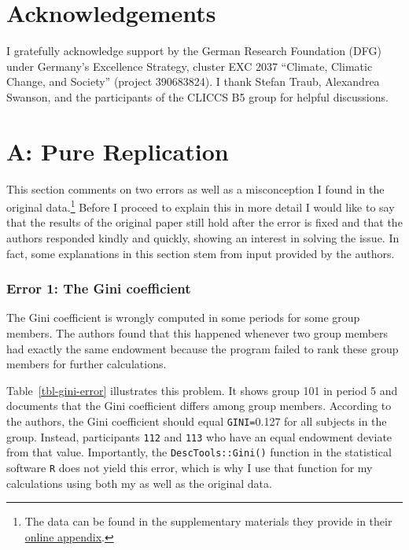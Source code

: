 \documentclass[
  authoryear,
  review,
  3p,
  onecolumn]{elsarticle}
\begin{document}
\hypertarget{acknowledgements}{%
\section{Acknowledgements}\label{acknowledgements}}

I gratefully acknowledge support by the German Research Foundation (DFG)
under Germany's Excellence Strategy, cluster EXC 2037 ``Climate,
Climatic Change, and Society'' (project 390683824). I thank Stefan
Traub, Alexandrea Swanson, and the participants of the CLICCS B5 group
for helpful discussions.

\newpage{}

\hypertarget{a-pure-replication}{%
\section{A: Pure Replication}\label{a-pure-replication}}

This section comments on two errors as well as a misconception I found
in the original data.\footnote{The data can be found in the
  supplementary materials they provide in their
  \href{https://www.sciencedirect.com/science/article/pii/S0047272717300361\#s0115}{online
  appendix}.} Before I proceed to explain this in more detail I would
like to say that the results of the original paper still hold after the
error is fixed and that the authors responded kindly and quickly,
showing an interest in solving the issue. In fact, some explanations in
this section stem from input provided by the authors.

\hypertarget{error-1-the-gini-coefficient}{%
\subsubsection{Error 1: The Gini
coefficient}\label{error-1-the-gini-coefficient}}

The Gini coefficient is wrongly computed in some periods for some group
members. The authors found that this happened whenever two group members
had exactly the same endowment because the program failed to rank these
group members for further calculations.

Table~\ref{tbl-gini-error} illustrates this problem. It shows group 101
in period 5 and documents that the Gini coefficient differs among group
members. According to the authors, the Gini coefficient should equal
\texttt{GINI=}0.127 for all subjects in the group. Instead, participants
\texttt{112} and \texttt{113} who have an equal endowment deviate from
that value. Importantly, the \texttt{DescTools::Gini()} function in the
statistical software \texttt{R} does not yield this error, which is why
I use that function for my calculations using both my as well as the
original data.
\end{document}
